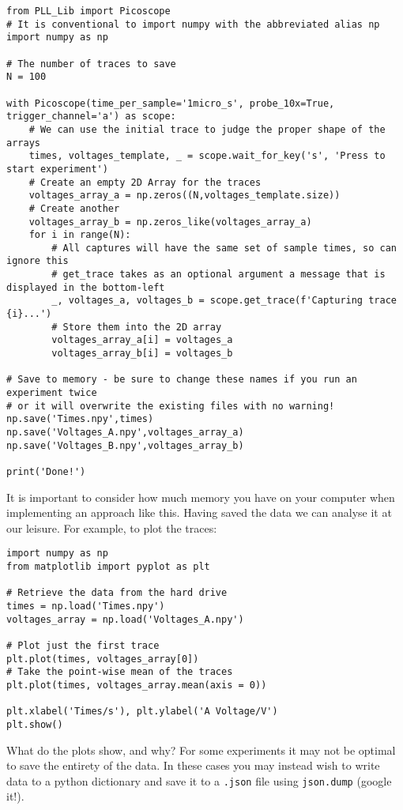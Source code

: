 \documentclass{article}
\begin{document}
\begin{verbatim}
from PLL_Lib import Picoscope
# It is conventional to import numpy with the abbreviated alias np
import numpy as np

# The number of traces to save
N = 100

with Picoscope(time_per_sample='1micro_s', probe_10x=True, trigger_channel='a') as scope:
    # We can use the initial trace to judge the proper shape of the arrays
    times, voltages_template, _ = scope.wait_for_key('s', 'Press to start experiment')
    # Create an empty 2D Array for the traces
    voltages_array_a = np.zeros((N,voltages_template.size))
    # Create another
    voltages_array_b = np.zeros_like(voltages_array_a)
    for i in range(N):
        # All captures will have the same set of sample times, so can ignore this
        # get_trace takes as an optional argument a message that is displayed in the bottom-left
        _, voltages_a, voltages_b = scope.get_trace(f'Capturing trace {i}...')
        # Store them into the 2D array
        voltages_array_a[i] = voltages_a
        voltages_array_b[i] = voltages_b

# Save to memory - be sure to change these names if you run an experiment twice
# or it will overwrite the existing files with no warning!
np.save('Times.npy',times)
np.save('Voltages_A.npy',voltages_array_a)
np.save('Voltages_B.npy',voltages_array_b)

print('Done!')
\end{verbatim}
It is important to consider how much memory you have on your computer when implementing an approach like this. Having saved the data we can analyse it at our leisure. For example, to plot the traces:

\begin{verbatim}
import numpy as np
from matplotlib import pyplot as plt

# Retrieve the data from the hard drive
times = np.load('Times.npy')
voltages_array = np.load('Voltages_A.npy')

# Plot just the first trace
plt.plot(times, voltages_array[0])
# Take the point-wise mean of the traces
plt.plot(times, voltages_array.mean(axis = 0))

plt.xlabel('Times/s'), plt.ylabel('A Voltage/V')
plt.show()
\end{verbatim}
What do the plots show, and why? For some experiments it may not be optimal to save the entirety of the data. In these cases you may instead wish to write data to a python dictionary and save it to a \texttt{.json} file using \texttt{json.dump} (google it!).
\end{document}
